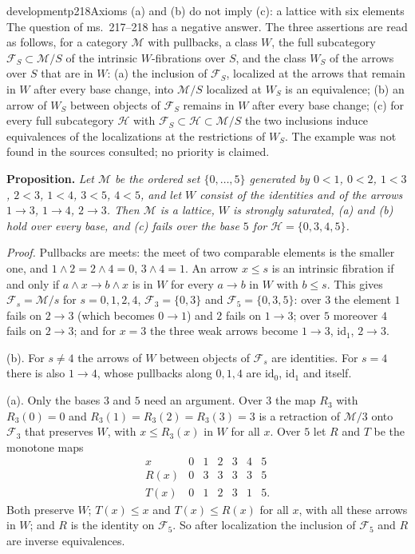 \begin{dcomment}{development}{p218}{Axioms (a) and (b) do not imply (c): a lattice with six elements}
The question of ms.~217--218 has a negative answer. The three assertions are read as follows, for a category $\mathcal M$ with pullbacks, a class $W$, the full subcategory $\mathcal F_S\subset\mathcal M/S$ of the intrinsic $W$-fibrations over $S$, and the class $W_S$ of the arrows over $S$ that are in $W$: (a) the inclusion of $\mathcal F_S$, localized at the arrows that remain in $W$ after every base change, into $\mathcal M/S$ localized at $W_S$ is an equivalence; (b) an arrow of $W_S$ between objects of $\mathcal F_S$ remains in $W$ after every base change; (c) for every full subcategory $\mathcal H$ with $\mathcal F_S\subset\mathcal H\subset\mathcal M/S$ the two inclusions induce equivalences of the localizations at the restrictions of $W_S$. The example was not found in the sources consulted; no priority is claimed.

\textbf{Proposition.}\ours
\textit{Let $\mathcal M$ be the ordered set $\{0,\dots,5\}$ generated by $0<1$, $0<2$, $1<3$, $2<3$, $1<4$, $3<5$, $4<5$, and let $W$ consist of the identities and of the arrows $1\to3$, $1\to4$, $2\to3$. Then $\mathcal M$ is a lattice, $W$ is strongly saturated, (a) and (b) hold over every base, and (c) fails over the base $5$ for $\mathcal H=\{0,3,4,5\}$.}

\textit{Proof.}
Pullbacks are meets: the meet of two comparable elements is the smaller one, and $1\wedge2=2\wedge4=0$, $3\wedge4=1$. An arrow $x\leq s$ is an intrinsic fibration if and only if $a\wedge x\to b\wedge x$ is in $W$ for every $a\to b$ in $W$ with $b\leq s$. This gives $\mathcal F_s=\mathcal M/s$ for $s=0,1,2,4$, $\mathcal F_3=\{0,3\}$ and $\mathcal F_5=\{0,3,5\}$: over $3$ the element $1$ fails on $2\to3$ (which becomes $0\to1$) and $2$ fails on $1\to3$; over $5$ moreover $4$ fails on $2\to3$; and for $x=3$ the three weak arrows become $1\to3$, $\mathrm{id}_1$, $2\to3$.

(b). For $s\neq4$ the arrows of $W$ between objects of $\mathcal F_s$ are identities. For $s=4$ there is also $1\to4$, whose pullbacks along $0,1,4$ are $\mathrm{id}_0$, $\mathrm{id}_1$ and itself.

(a). Only the bases $3$ and $5$ need an argument. Over $3$ the map $R_3$ with $R_3(0)=0$ and $R_3(1)=R_3(2)=R_3(3)=3$ is a retraction of $\mathcal M/3$ onto $\mathcal F_3$ that preserves $W$, with $x\leq R_3(x)$ in $W$ for all $x$. Over $5$ let $R$ and $T$ be the monotone maps
\[
\begin{array}{c|cccccc}
x&0&1&2&3&4&5\\ \hline
R(x)&0&3&3&3&3&5\\
T(x)&0&1&2&3&1&5 .
\end{array}
\]
Both preserve $W$; $T(x)\leq x$ and $T(x)\leq R(x)$ for all $x$, with all these arrows in $W$; and $R$ is the identity on $\mathcal F_5$. So after localization the inclusion of $\mathcal F_5$ and $R$ are inverse equivalences.


\end{dcomment}
